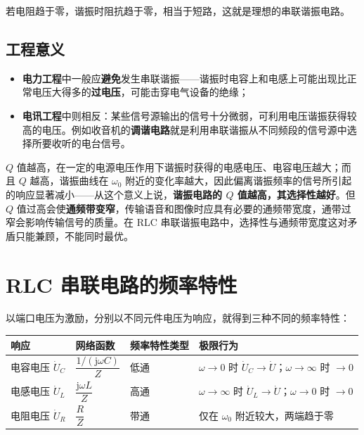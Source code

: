 若电阻趋于零，谐振时阻抗趋于零，相当于短路，这就是理想的串联谐振电路。

\subsection{工程意义}
\begin{itemize}
  \item \textbf{电力工程}中一般应\textbf{避免}发生串联谐振——谐振时电容上和电感上可能出现比正常电压大得多的\textbf{过电压}，可能击穿电气设备的绝缘；
  \item \textbf{电讯工程}中则相反：某些信号源输出的信号十分微弱，可利用电压谐振获得较高的电压。例如收音机的\textbf{调谐电路}就是利用串联谐振从不同频段的信号源中选择所要收听的电台信号。
\end{itemize}

$Q$ 值越高，在一定的电源电压作用下谐振时获得的电感电压、电容电压越大；而且 $Q$ 越高，谐振曲线在 $\omega_0$ 附近的变化率越大，因此偏离谐振频率的信号所引起的响应显著减小——从这个意义上说，\textbf{谐振电路的 $Q$ 值越高，其选择性越好}。但 $Q$ 值过高会使\textbf{通频带变窄}，传输语音和图像时应具有必要的通频带宽度，通带过窄会影响传输信号的质量。在 RLC 串联谐振电路中，选择性与通频带宽度这对矛盾只能兼顾，不能同时最优。


\section{RLC 串联电路的频率特性}
以端口电压为激励，分别以不同元件电压为响应，就得到三种不同的频率特性：

\begin{center}
\begin{tabular}{@{}llll@{}}
\toprule
响应 & 网络函数 & 频率特性类型 & 极限行为 \\
\midrule
电容电压 $\dot{U}_C$ & $\dfrac{1/\left(\mathrm{j}\omega C\right)}{Z}$ & 低通 & $\omega\to0$ 时 $\dot{U}_C\to\dot{U}$；$\omega\to\infty$ 时 $\to0$ \\
电感电压 $\dot{U}_L$ & $\dfrac{\mathrm{j}\omega L}{Z}$ & 高通 & $\omega\to\infty$ 时 $\dot{U}_L\to\dot{U}$；$\omega\to0$ 时 $\to0$ \\
电阻电压 $\dot{U}_R$ & $\dfrac{R}{Z}$ & 带通 & 仅在 $\omega_0$ 附近较大，两端趋于零 \\
\bottomrule
\end{tabular}
\end{center}

